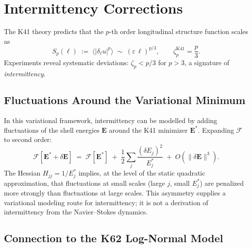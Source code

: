 \documentclass[12pt,a4paper]{article}
\theoremstyle{definition}
\theoremstyle{plain}
\theoremstyle{remark}
\begin{document}
\section{Intermittency Corrections}\label{sec:intermittency}

The K41 theory predicts that the $p$-th order longitudinal structure
function scales as
\begin{equation}\label{eq:Sp_K41}
  S_p(\ell) \;:=\;
  \bigl\langle |\delta_\ell u|^p \bigr\rangle
  \;\sim\; (\varepsilon\,\ell)^{p/3},
  \qquad
  \zeta_p^{\mathrm{K41}} = \frac{p}{3}.
\end{equation}
Experiments reveal systematic deviations: $\zeta_p < p/3$ for $p > 3$,
a signature of \emph{intermittency}.

\subsection{Fluctuations Around the Variational Minimum}

In this variational framework, intermittency can be modelled by adding
fluctuations of the shell energies $\mathbf{E}$ around the K41 minimizer
$\mathbf{E}^*$.  Expanding $\mathcal{F}$ to second order:
\begin{equation}\label{eq:F_expand}
  \mathcal{F}[\mathbf{E}^* + \delta\mathbf{E}]
  \;=\;
  \mathcal{F}[\mathbf{E}^*]
  \;+\;
  \frac{1}{2}\sum_{j}
    \frac{(\delta E_j)^2}{E_j^*}
  \;+\; O(\|\delta\mathbf{E}\|^3).
\end{equation}
The Hessian $H_{jj} = 1/E_j^*$ implies, at the level of the static
quadratic approximation, that fluctuations at small scales (large $j$,
small $E_j^*$) are penalized more strongly than fluctuations at large
scales.  This asymmetry supplies a variational modeling route for
intermittency; it is not a derivation of intermittency from the
Navier--Stokes dynamics.

\subsection{Connection to the K62 Log-Normal Model}
\end{document}
